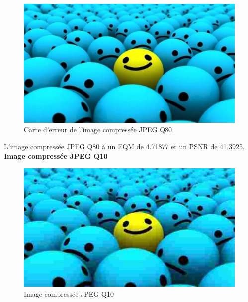 \documentclass[12pt]{report}
\begin{document}
\begin{figure}[H]
\begin{center}
\includegraphics[scale=0.5]{../smileyDegQ80.jpg} 
\caption{Carte d'erreur de l'image compressée JPEG Q80 }
\end{center}
\end{figure}

L'image compressée JPEG Q80 à un EQM de 4.71877 et un PSNR de 41.3925.\\

\textbf{Image compressée JPEG Q10}

\begin{figure}[H]
\begin{center}
\includegraphics[scale=0.5]{../smileyDegQ10.jpg} 
\caption{Image compressée JPEG Q10 }
\end{center}
\end{figure}
\end{document}
